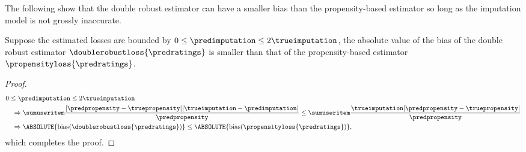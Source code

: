The following show that the double robust estimator can have a smaller bias than the propensity-based estimator so long as the imputation model is not grossly inaccurate.
\begin{theorem}
\label{thm:bias}
Suppose the estimated losses are bounded by $0\leq\predimputation\leq 2\trueimputation$, the absolute value of the bias of the double robust estimator $\doublerobustloss{\predratings}$ is smaller than that of the propensity-based estimator $\propensityloss{\predratings}$.
\end{theorem}%
\begin{proof}
\begin{equation*}
\begin{aligned}
&
0\leq\predimputation\leq 2\trueimputation
\\&\quad\Rightarrow
\sumuseritem
\frac{|\predpropensity-\truepropensity||\trueimputation-\predimputation|}{\predpropensity}
\leq
\sumuseritem
\frac{\trueimputation|\predpropensity-\truepropensity|}{\predpropensity}
\\&\quad\Rightarrow
\ABSOLUTE{
\text{bias}(\doublerobustloss{\predratings})
}
\leq
\ABSOLUTE{
\text{bias}(\propensityloss{\predratings})
}
\text{,}
\end{aligned}
\end{equation*}%
which completes the proof.
\end{proof}

